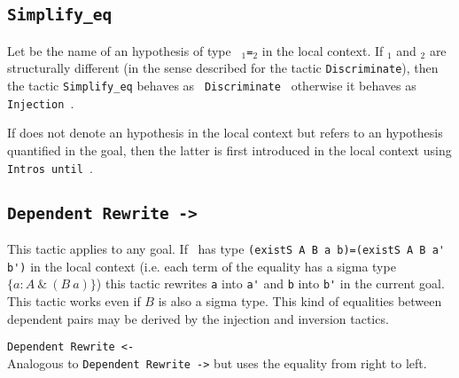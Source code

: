\subsection{\tt Simplify\_eq {\ident}}
\label{Simplify-eq}
Let {\ident} be the name of an hypothesis of type {\tt
  {\term$_1$}={\term$_2$}} in the local context. If {\term$_1$} and
{\term$_2$} are structurally different (in the sense described for the
tactic {\tt Discriminate}), then the tactic {\tt Simplify\_eq} behaves as {\tt
  Discriminate {\ident}} otherwise it behaves as {\tt Injection
  {\ident}}.

\Rem If {\ident} does not denote an hypothesis in the local context
but refers to an hypothesis quantified in the goal, then the
latter is first introduced in the local context using
\texttt{Intros until \ident}.


\subsection{\tt Dependent Rewrite -> {\ident}}
\label{Dependent-Rewrite}
This tactic applies to any goal.  If \ident\ has type 
\verb+(existS A B a b)=(existS A B a' b')+ 
in the local context (i.e. each term of the
equality has a sigma type $\{ a:A~ \&~(B~a)\}$) this tactic rewrites
\verb+a+ into \verb+a'+ and \verb+b+ into \verb+b'+ in the current
goal. This tactic works even if $B$ is also a sigma type.  This kind
of equalities between dependent pairs may be derived by the injection
and inversion tactics.

\begin{Variants}
\item{\tt Dependent Rewrite <- {\ident}}
 \\
Analogous to {\tt Dependent Rewrite ->} but uses the equality from
right to left.
\end{Variants}

